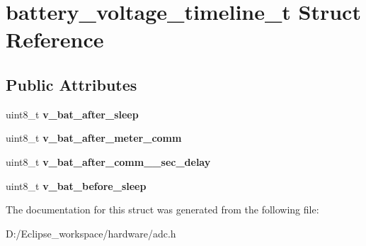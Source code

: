 \hypertarget{structbattery__voltage__timeline__t}{}\section{battery\+\_\+voltage\+\_\+timeline\+\_\+t Struct Reference}
\label{structbattery__voltage__timeline__t}
\subsection*{Public Attributes}
\begin{DoxyCompactItemize}
\item 
\hypertarget{structbattery__voltage__timeline__t_adc8eec80bcc8d89d2c96164b9aac6f8b}{}uint8\+\_\+t {\bfseries v\+\_\+bat\+\_\+after\+\_\+sleep}\label{structbattery__voltage__timeline__t_adc8eec80bcc8d89d2c96164b9aac6f8b}

\item 
\hypertarget{structbattery__voltage__timeline__t_a296aa260fb4155b1d0a7a0a2fe6afe2c}{}uint8\+\_\+t {\bfseries v\+\_\+bat\+\_\+after\+\_\+meter\+\_\+comm}\label{structbattery__voltage__timeline__t_a296aa260fb4155b1d0a7a0a2fe6afe2c}

\item 
\hypertarget{structbattery__voltage__timeline__t_a781c4cb0eb84b14a6268b01537ef5a42}{}uint8\+\_\+t {\bfseries v\+\_\+bat\+\_\+after\+\_\+comm\+\_\+\_\+sec\+\_\+delay}\label{structbattery__voltage__timeline__t_a781c4cb0eb84b14a6268b01537ef5a42}

\item 
\hypertarget{structbattery__voltage__timeline__t_acaaac2ad31e77db06b52e9e6a623b6e2}{}uint8\+\_\+t {\bfseries v\+\_\+bat\+\_\+before\+\_\+sleep}\label{structbattery__voltage__timeline__t_acaaac2ad31e77db06b52e9e6a623b6e2}

\end{DoxyCompactItemize}


The documentation for this struct was generated from the following file\+:\begin{DoxyCompactItemize}
\item 
D\+:/\+Eclipse\+\_\+workspace/hardware/adc.\+h\end{DoxyCompactItemize}
